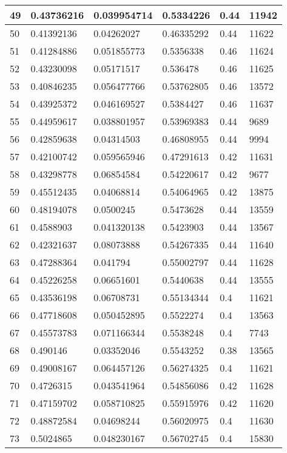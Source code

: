 \begin{longtable}{|l|l|l|l|l|l|}
49 & 0.43736216 & 0.039954714 & 0.5334226 & 0.44 & 11942 \\ \hline 
50 & 0.41392136 & 0.04262027 & 0.46335292 & 0.44 & 11622 \\ \hline 
51 & 0.41284886 & 0.051855773 & 0.5356338 & 0.46 & 11624 \\ \hline 
52 & 0.43230098 & 0.05171517 & 0.536478 & 0.46 & 11625 \\ \hline 
53 & 0.40846235 & 0.056477766 & 0.53762805 & 0.46 & 13572 \\ \hline 
54 & 0.43925372 & 0.046169527 & 0.5384427 & 0.46 & 11637 \\ \hline 
55 & 0.44959617 & 0.038801957 & 0.53969383 & 0.44 & 9689 \\ \hline 
56 & 0.42859638 & 0.04314503 & 0.46808955 & 0.44 & 9994 \\ \hline 
57 & 0.42100742 & 0.059565946 & 0.47291613 & 0.42 & 11631 \\ \hline 
58 & 0.43298778 & 0.06854584 & 0.54220617 & 0.42 & 9677 \\ \hline 
59 & 0.45512435 & 0.04068814 & 0.54064965 & 0.42 & 13875 \\ \hline 
60 & 0.48194078 & 0.0500245 & 0.5473628 & 0.44 & 13559 \\ \hline 
61 & 0.4588903 & 0.041320138 & 0.5423903 & 0.44 & 13567 \\ \hline 
62 & 0.42321637 & 0.08073888 & 0.54267335 & 0.44 & 11640 \\ \hline 
63 & 0.47288364 & 0.041794 & 0.55002797 & 0.44 & 11628 \\ \hline 
64 & 0.45226258 & 0.06651601 & 0.5440638 & 0.44 & 13555 \\ \hline 
65 & 0.43536198 & 0.06708731 & 0.55134344 & 0.4 & 11621 \\ \hline 
66 & 0.47718608 & 0.050452895 & 0.5522274 & 0.4 & 13563 \\ \hline 
67 & 0.45573783 & 0.071166344 & 0.5538248 & 0.4 & 7743 \\ \hline 
68 & 0.490146 & 0.03352046 & 0.5543252 & 0.38 & 13565 \\ \hline 
69 & 0.49008167 & 0.064457126 & 0.56274325 & 0.4 & 11621 \\ \hline 
70 & 0.4726315 & 0.043541964 & 0.54856086 & 0.42 & 11628 \\ \hline 
71 & 0.47159702 & 0.058710825 & 0.55915976 & 0.42 & 11620 \\ \hline 
72 & 0.48872584 & 0.04698244 & 0.56020975 & 0.4 & 11630 \\ \hline 
73 & 0.5024865 & 0.048230167 & 0.56702745 & 0.4 & 15830 \\ \hline 

\end{longtable}

